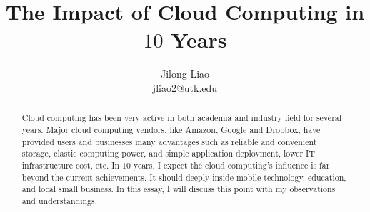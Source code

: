 \documentclass[11pt, times]{article}
\begin{document}
\title{The Impact of Cloud Computing in $10$ Years}
\author{Jilong Liao\\jliao2@utk.edu}
\maketitle

\begin{abstract}
Cloud computing has been very active in both academia and industry field for several years. Major cloud computing vendors, like Amazon, Google and Dropbox, have provided users and businesses many advantages such as reliable and convenient storage, elastic computing power, and simple application deployment, lower IT infrastructure cost, etc. In $10$ years, I expect the cloud computing's influence is far beyond the current achievements. It should deeply inside mobile technology, education, and local small business. In this essay, I will discuss this point with my observations and understandings.
\end{abstract}





\end{document}
